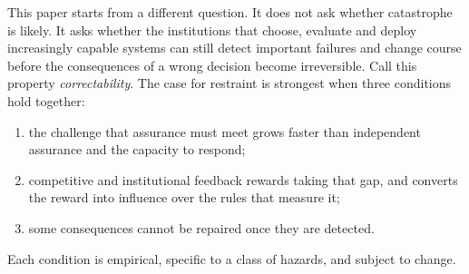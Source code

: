 \documentclass[11pt]{article}
\theoremstyle{plain}
\theoremstyle{definition}
\begin{document}
This paper starts from a different question. It does not ask whether catastrophe is likely. It asks whether the institutions that choose, evaluate and deploy increasingly capable systems can still detect important failures and change course before the consequences of a wrong decision become irreversible. Call this property \emph{correctability}. The case for restraint is strongest when three conditions hold together:
\begin{enumerate}[label=(\roman*)]
\item the challenge that assurance must meet grows faster than independent assurance and the capacity to respond;
\item competitive and institutional feedback rewards taking that gap, and converts the reward into influence over the rules that measure it;
\item some consequences cannot be repaired once they are detected.
\end{enumerate}
Each condition is empirical, specific to a class of hazards, and subject to change.
\end{document}

